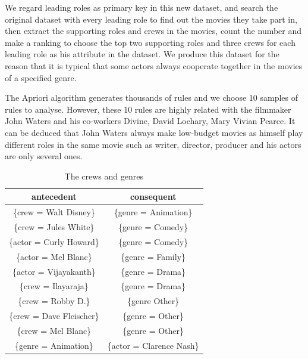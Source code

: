 \documentclass[conference]{IEEEtran}
\begin{document}
We regard leading roles as primary key in this new dataset, and search the original dataset with every leading role to find out the movies they take part in, then extract the supporting roles and crews in the movies, count the number and make a ranking to choose the top two supporting roles and three crews for each leading role as his attribute in the dataset. We produce this dataset for the reason that it is typical that some actors always cooperate together in the  movies of a specified genre.

The Apriori algorithm generates thousands of rules and we choose 10 samples of rules to analyse. However, these 10 rules are highly related with the filmmaker John Waters and his co-workers Divine, David Lochary, Mary Vivian Pearce. It can be deduced that John Waters always make low-budget movies as himself play different roles in the same movie such as writer, director, producer and his actors are only several ones.

\begin{table}[!hbp]
	\caption{The crews and genres}
	\begin{center}	
		\begin{tabular}{|c||c|}
				\hline
				antecedent & consequent \\
				\hline
				\{crew = Walt Disney\} & \{genre = Animation\} \\
				\hline
				\{crew = Jules White\} & \{genre = Comedy\} \\
				\hline
				\{actor = Curly Howard\} & \{genre = Comedy\} \\
				\hline
				\{actor = Mel Blanc\} & \{genre = Family\} \\
				\hline
				\{actor = Vijayakanth\} & \{genre = Drama\} \\
				\hline
				\{crew = Ilayaraja\} & \{genre = Drama\} \\
				\hline
				\{crew = Robby D.\} & \{genre Other\} \\
				\hline
				\{crew = Dave Fleischer\} & \{genre = Other\} \\
				\hline
				\{crew = Mel Blanc\} & \{genre = Other\} \\
				\hline
				\{genre = Animation\} & \{actor = Clarence Nash\} \\
				\hline
			
		\end{tabular}
	\end{center}
\end{table}
\end{document}
